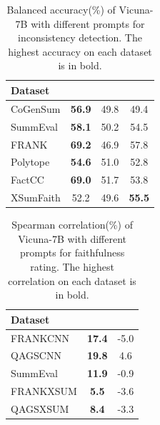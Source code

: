 \begin{table}[t]
	\scriptsize
	\centering
	\begin{tabular}{l|ccc}
		\toprule[1pt]
		Dataset & \citet{chen2023evaluating} & \citet{gao2023human} & 	\citet{luo2023chatgpt}  \\
		\hline
		CoGenSum & \textbf{56.9} & 49.8 & 49.4 \\
		SummEval & \textbf{58.1} & 50.2 & 54.5 \\
		FRANK & \textbf{69.2}  & 46.9 & 57.8 \\
	Polytope	& \textbf{54.6} & 51.0 & 52.8 \\
	FactCC & \textbf{69.0} & 51.7 & 53.8 \\
	XSumFaith & 52.2 & 49.6 & \textbf{55.5} \\
		
		
		\bottomrule[1pt]
	\end{tabular}
	\caption{Balanced accuracy(\%) of Vicuna-7B with different prompts for inconsistency detection. The highest accuracy on each dataset is in bold.} 
	\label{tab:vicuna-prompt-id}
\end{table}

\begin{table}[t]
	\scriptsize
	\centering
	\begin{tabular}{l|cc}
		\toprule[1pt]
		Dataset & 	\citet{gao2023human} & \citet{luo2023chatgpt}\\
		\hline
		FRANKCNN & \textbf{17.4} & -5.0 \\
		QAGSCNN & \textbf{19.8} & 4.6 \\
		SummEval & \textbf{11.9} & -0.9 \\
		FRANKXSUM &\textbf{5.5} & -3.6 \\
		QAGSXSUM & \textbf{8.4} & -3.3 \\
		
		
		\bottomrule[1pt]
	\end{tabular}
	\caption{Spearman correlation(\%) of Vicuna-7B with different prompts for faithfulness rating. The highest correlation on each dataset is in bold.} 
	\label{tab:vicuna-prompt-fr}
\end{table}